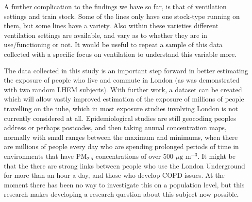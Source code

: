 A further complication to the findings we have so far, is that of ventilation settings and train stock. Some of the lines only have one stock-type running on them, but some lines have a variety. Also within these varieties different ventilation settings are available, and vary as to whether they are in use/functioning or not. It would be useful to repeat a sample of this data collected with a specific focus on ventilation to understand this variable more.

The data collected in this study is an important step forward in better estimating the exposure of people who live and commute in London (as was demonstrated with two random LHEM subjects). With further work, a dataset can be created which will allow vastly improved estimation of the exposure of millions of people travelling on the tube, which in most exposure studies involving London is not currently considered at all. Epidemiological studies are still geocoding peoples address or perhaps postcodes, and then taking annual concentration maps, normally with small ranges between the maximum and minimums, when there are millions of people every day who are spending prolonged periods of time in environments that have PM$_{2.5}$ concentrations of over 500 $\mu \text{g m}^{-3}$. It might be that the there are strong links between people who use the London Underground for more than an hour a day, and those who develop COPD issues. At the moment there has been no way to investigate this on a population level, but this research makes developing a research question about this subject now possible.


